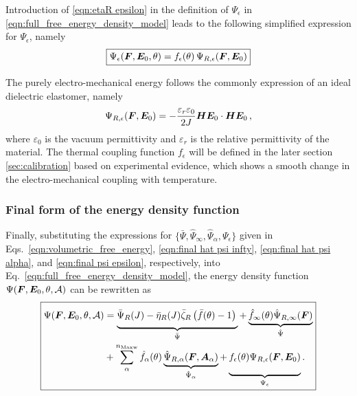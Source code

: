 Introduction of \eqref{eqn:etaR epsilon} in the definition of $\Psi_{\epsilon}$ in \eqref{eqn:full_free_energy_density_model}
leads to the following simplified expression for $\Psi_{\epsilon}$, namely
%
\begin{equation*}\label{eqn:final psi epsilon}
\boxed{
	\Psi_{\epsilon}(\boldsymbol{F},\boldsymbol{E}_0,\theta)=f_{\epsilon}(\theta)\,\Psi_{R,\epsilon}(\boldsymbol{F},\boldsymbol{E}_0)
	}
\end{equation*}

The purely electro-mechanical energy follows the commonly expression of an ideal dielectric elastomer, namely
\begin{equation} \label{eqn:electro_mech_coupling_ref}
	\Psi_{R,\epsilon}(\boldsymbol{F},\boldsymbol{E}_0) = -\frac{\varepsilon_r \varepsilon_0}{2J}\boldsymbol{H}\boldsymbol{E}_0 \cdot \boldsymbol{H}\boldsymbol{E}_0 \,,
\end{equation}
where $\varepsilon_0$ is the vacuum permittivity and $\varepsilon_r$ is the relative permittivity of the material. The thermal coupling function $f_\epsilon$ will be defined in the later section \ref{sec:calibration} based on experimental evidence, which shows a smooth change in the electro-mechanical coupling with temperature.



\subsubsection{Final form of the energy density function}


Finally, substituting the expressions for
$\{\bar\Psi,\hat\Psi_{\infty},\hat\Psi_{\alpha},\Psi_{\epsilon}\}$
given in Eqs.~\eqref{eqn:volumetric_free_energy},
\eqref{eqn:final hat psi infty},
\eqref{eqn:final hat psi alpha}, and
\eqref{eqn:final psi epsilon},
respectively, into
Eq.~\eqref{eqn:full_free_energy_density_model},
the  energy density function
$\Psi(\boldsymbol{F},\boldsymbol{E}_0,\theta,\mathcal{A})$
can be rewritten as
%
\begin{equation}\label{eqn:compact form energy}
	\boxed{			\begin{aligned}
			\Psi(\F,\E_0,\theta,\A) &=
			\underbrace{%
				\bar\Psi_R(J) - \bar\eta_R(J) \bar\zeta_R \left(\bar f(\theta)-1\right) \vphantom{\frac{A}{B}}%
			}_{\bar\Psi} + 
			\underbrace{%
			\hat f_\infty(\theta)	\hat\Psi_{R,\infty}(\F) }_{{\hat\Psi}}\\&+ \sum_\alpha^{n_\text{Maxw}} \hat f_\alpha(\theta) \underbrace{\hat\Psi_{R,\alpha}(\F,\Aa) %
			}_{\hat\Psi_{\alpha}} +
			\underbrace{%
			f_\epsilon(\theta)	\Psi_{R,\epsilon}(\F,\E_0)  \vphantom{\sum_{a}^{n_M}}%
			}_{\Psi_\epsilon} .
	\end{aligned}}
\end{equation}

